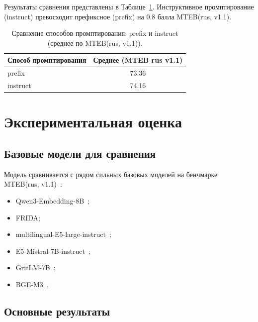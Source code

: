 Результаты сравнения представлены в Таблице~\ref{tab:ge_prompting}. Инструктивное промптирование (instruct) превосходит префиксное (prefix) на 0.8 балла MTEB(rus, v1.1).

\begin{table}[H]
    \centering
    \caption{Сравнение способов промптирования: prefix и instruct (среднее по MTEB(rus, v1.1)).}
    \label{tab:ge_prompting}
    \begin{tabular}{lc}
        \toprule
        Способ промптирования & Среднее (MTEB rus v1.1) \\
        \midrule
        prefix   & 73.36 \\
        instruct & 74.16 \\
        \bottomrule
    \end{tabular}
\end{table}

\section{Экспериментальная оценка}\label{sec:ge_evaluation}

\subsection{Базовые модели для сравнения}\label{subsec:ge_baselines}

Модель сравнивается с рядом сильных базовых моделей на бенчмарке MTEB(rus, v1.1)~\cite{snegirev2025rumteb}:
\begin{itemize}
    \item Qwen3-Embedding-8B~\cite{2506.05176};
    \item FRIDA;
    \item multilingual-E5-large-instruct~\cite{2212.03533};
    \item E5-Mistral-7B-instruct~\cite{2401.00368};
    \item GritLM-7B~\cite{muennighoff2025gritlm};
    \item BGE-M3~\cite{2309.07597}.
\end{itemize}

\subsection{Основные результаты}\label{subsec:ge_main_results}

